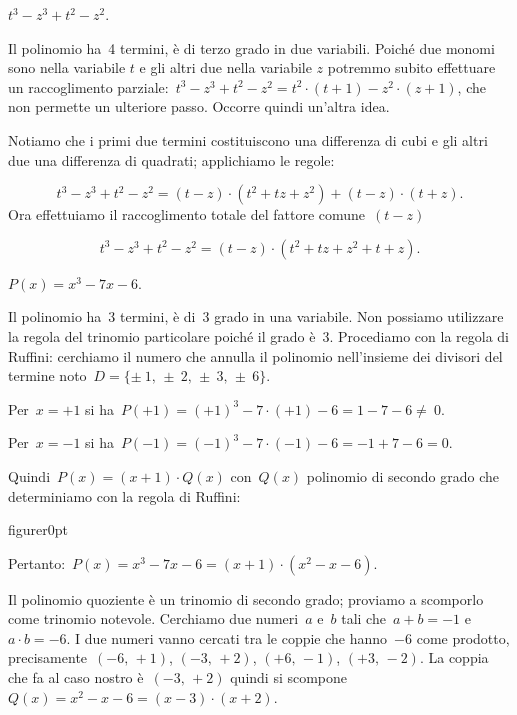 \begin{exrig}
 \begin{esempio}
 $t^{{3}}-z^{{3}}+t^{2}-z^{2}$.

Il polinomio ha~4 termini, è di terzo grado in due variabili.
Poiché due monomi sono nella variabile $t$ e gli altri due nella
variabile $z$ potremmo subito effettuare un raccoglimento
parziale:~$t^{{3}}-z^{{3}}+t^{2}-z^{2}=t^{2}\cdot\left(t+1\right)-z^{2}\cdot \left(z+1\right)$,
che non permette un ulteriore passo. Occorre quindi un'altra
idea.

Notiamo che i primi due termini costituiscono una differenza di cubi e
gli altri due una differenza di quadrati; applichiamo le regole:

\begin{equation*}
t^{{3}}-z^{{3}}+t^{2}-z^{2}=\left(t-z\right)\cdot
\left(t^{2}+tz+z^{2}\right)+\left(t-z\right)\cdot
\left(t+z\right).
\end{equation*}
Ora effettuiamo il raccoglimento totale del fattore comune~$(t-z)$

\begin{equation*}
t^{3}-z^{3}+t^{2}-z^{2} = \left(t-z\right)\cdot
\left(t^{2}+tz+z^{2}+t+z\right).
\end{equation*}
 \end{esempio}

 \begin{esempio}
 $P(x)=x^{{3}}-7x-6$.
 \end{esempio}

Il polinomio ha~3 termini, è di~3{\textdegree} grado in una variabile.
Non possiamo utilizzare la regola del trinomio particolare poiché il
grado è~3. Procediamo con la regola di Ruffini: cerchiamo il numero che annulla 
il polinomio nell'insieme dei divisori del termine
noto~$D=\{\pm~1\text{,~}\pm~2\text{,~}\pm~3\text{,~}\pm~6\}$.

Per~$x=+1$ si ha~$P(+1)=(+1)^{3}-7\cdot (+1)-6=1-7-6\neq~0$.

Per~$x=-1$ si ha~$P(-1)=(-1)^{3}-7\cdot (-1)-6=-1+7-6=0$.

Quindi~$P(x)=\left(x+1\right)\cdot Q(x)$ con~$Q(x)$ polinomio di
secondo grado che determiniamo con la regola di Ruffini:

\begin{wrapfloat}{figure}{r}{0pt}
 
\end{wrapfloat}
Pertanto:~$P(x)=x^{3}-7x-6=\left(x+1\right)\cdot \left(x^{2}-x-6\right)$.

Il polinomio quoziente è un trinomio di secondo grado; proviamo a
scomporlo come trinomio notevole.
Cerchiamo due numeri~$a$ e~$b$ tali che~$a+b=-1$ e~$a\cdot b=-6$.
I due numeri vanno cercati tra le coppie che hanno~$-6$ come prodotto,
precisamente~$(-6\text{,~}+1)$, $(-3\text{,~}+2)$, $(+6\text{,~}-1)$, $(+3\text{,~}-2)$. La coppia che fa al
caso nostro è~$(-3\text{,~}+2)$ quindi si
scompone~$Q(x)=x^{2}-x-6=\left(x-3\right)\cdot \left(x+2\right)$.


\end{exrig}
